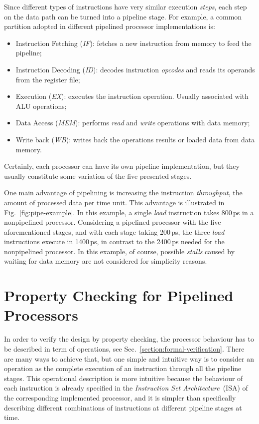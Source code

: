 Since different types of instructions have very similar execution \textit{steps}, each step on the data path can be turned into a pipeline stage. For example, a common partition adopted in different pipelined processor implementations is: 

\begin{itemize}
\item Instruction Fetching (\textit{IF}): fetches a new instruction from memory to feed the pipeline;
\item Instruction Decoding (\textit{ID}): decodes instruction \textit{opcodes} and reads its operands from the register file;
\item Execution (\textit{EX}): executes the instruction operation. Usually associated with ALU operations;
\item Data Access (\textit{MEM}): performs \textit{read} and \textit{write} operations with data memory;
\item Write back (\textit{WB}): writes back the operations results or loaded data from data memory.
\end{itemize}

Certainly, each processor can have its own pipeline implementation, but they usually constitute some variation of the five presented stages.

One main advantage of pipelining is increasing the instruction \textit{throughput}, the amount of processed data per time unit. This advantage is illustrated in Fig.~\ref{fig:pipe-example}. In this example, a single \textit{load} instruction takes 800\,ps in a nonpipelined processor. Considering a pipelined processor with the five aforementioned stages, and with each stage taking 200\,ps, the three \textit{load} instructions execute in 1400\,ps, in contrast to the 2400\,ps needed for the nonpipelined processor. In this example, of course, possible \textit{stalls} caused by waiting for data memory are not considered for simplicity reasons. 
\section{Property Checking for Pipelined Processors}
\label{section:ipc-pipe-processor}

In order to verify the design by property checking, the processor behaviour has to be described in term of operations, see Sec.~\ref{section:formal-verification}. There are many ways to achieve that, but one simple and intuitive way is to consider an operation as the complete execution of an instruction through all the pipeline stages. This operational description is more intuitive because the behaviour of each instruction is already specified in the \textit{Instruction Set Architecture}~(ISA) of the corresponding implemented processor, and it is simpler than specifically describing different combinations of instructions at different pipeline stages at time.

